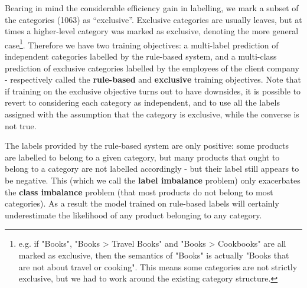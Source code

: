 Bearing in mind the considerable efficiency gain in labelling, we mark a subset of the categories (1063) as ``exclusive''.
Exclusive categories are usually leaves, but at times a higher-level category was marked as exclusive, denoting the more general case\footnote{e.g. if "Books", "Books > Travel Books" and "Books > Cookbooks" are all marked as exclusive, then the semantics of "Books" is actually "Books that are not about travel or cooking". This means some categories are not strictly exclusive, but we had to work around the existing category structure.}.
Therefore we have two training objectives: a multi-label prediction of independent categories labelled by the rule-based system, and a multi-class prediction of exclusive categories labelled by the employees of the client company - respectively called the \textbf{rule-based} and \textbf{exclusive} training objectives.
Note that if training on the exclusive objective turns out to have downsides, it is possible to revert to considering each category as independent, and to use all the labels assigned with the assumption that the category is exclusive, while the converse is not true.

\label{label_imbalance}

The labels provided by the rule-based system are only positive:  some products are labelled to belong to a given category, but many products that ought to belong to a category are not labelled  accordingly -  but their label still appears to be negative.
This (which we call the \textbf{label imbalance} problem) only exacerbates the \textbf{class imbalance} problem (that most products do not belong to most categories).
As a result the model trained on rule-based labels will certainly underestimate the likelihood of any product belonging to any category.

